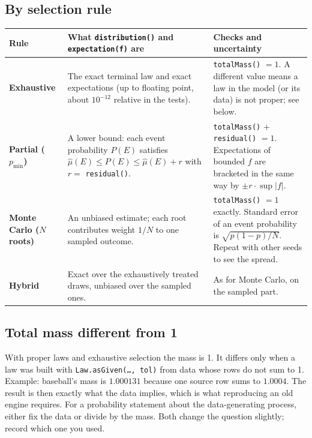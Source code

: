 \documentclass[11pt]{article}
\newcommand{\code}[1]{\texttt{#1}}
\begin{document}
\subsection{By selection rule}
\begin{center}
\small
\begin{tabularx}{\linewidth}{@{}>{\bfseries}p{2.4cm} Y Y@{}}
\toprule
Rule & What \code{distribution()} and \code{expectation(f)} are & Checks and uncertainty\\
\midrule
Exhaustive & The exact terminal law and exact expectations (up to floating point, about $10^{-12}$ relative in the tests). &
  \code{totalMass()} $=1$. A different value means a law in the model (or its data) is not proper; see below.\\
Partial ($p_{\min}$) & A lower bound: each event probability $P(E)$ satisfies
  $\widehat\mu(E)\le P(E)\le\widehat\mu(E)+r$ with $r=$ \code{residual()}. &
  \code{totalMass()} $+$ \code{residual()} $=1$. Expectations of bounded $f$ are bracketed in the same way
  by $\pm r\cdot\sup|f|$.\\
Monte Carlo ($N$ roots) & An unbiased estimate; each root contributes weight $1/N$ to one sampled outcome. &
  \code{totalMass()} $=1$ exactly. Standard error of an event probability is $\sqrt{p(1-p)/N}$.
  Repeat with other seeds to see the spread.\\
Hybrid & Exact over the exhaustively treated draws, unbiased over the sampled ones. & As for Monte Carlo, on the sampled part.\\
\bottomrule
\end{tabularx}
\end{center}

\subsection{Total mass different from 1}
With proper laws and exhaustive selection the mass is 1. It differs only when a law was built with
\code{Law.asGiven(\dots, tol)} from data whose rows do not sum to 1. Example: baseball's mass is $1.000131$ because one
source row sums to $1.0004$. The result is then exactly what the data implies, which is what reproducing an old engine
requires. For a probability statement about the data-generating process, either fix the data or divide by the mass.
Both change the question slightly; record which one you used.
\end{document}
